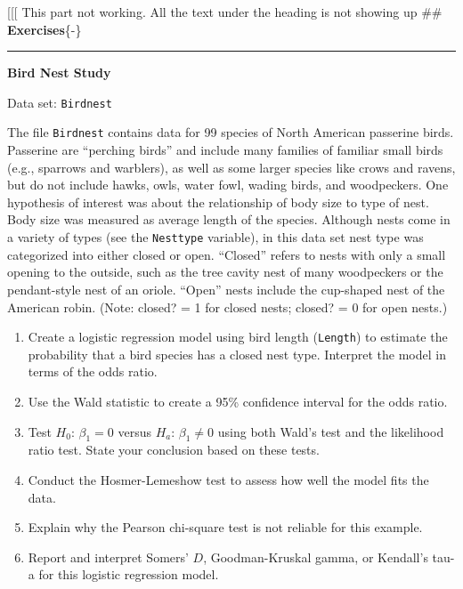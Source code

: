 \documentclass[
]{report}
\begin{document}
{[}{[}{[} This part not working. All the text under the heading is not showing up
\#\# \textbf{Exercises}\{-\}
\vspace{-2em}
\noindent

\rule{\linewidth}{0.4pt}

\renewcommand{\theexcountlr}{E.\arabic{excountlr}}

\begin{list}{E..}{ \setlength{\itemsep}{1.2em}}

  \item \textbf{Bird Nest Study}

Data set: \texttt{Birdnest}

The file \texttt{Birdnest} contains data for 99 species of North American passerine birds. Passerine are “perching birds” and include many families of familiar small birds (e.g., sparrows and warblers), as well as some larger species like crows and ravens, but do not include hawks, owls, water fowl, wading birds, and woodpeckers. One hypothesis of interest was about the relationship of body size to type of nest. Body size was measured as average length of the species. Although nests come in a variety of types (see the \texttt{Nesttype} variable), in this data set nest type was categorized into either closed or open. “Closed” refers to nests with only a small opening to the outside, such as the tree cavity nest of many woodpeckers or the pendant-style nest of an oriole. “Open” nests include the cup-shaped nest of the American robin. (Note: closed? = 1 for closed nests; closed? = 0 for open nests.)

  \begin{enumerate}
    \item Create a logistic regression model using bird length (\texttt{Length}) to estimate the probability that a bird species has a closed nest type. Interpret the model in terms of the odds ratio.
    \item Use the Wald statistic to create a 95\% confidence interval for the odds ratio.
    \item Test $H_0$: $\beta_1 = 0$ versus $H_a$: $\beta_1 \ne 0$ using both Wald’s test and the likelihood ratio test. State your conclusion based on these tests.
    \item Conduct the Hosmer-Lemeshow test to assess how well the model fits the data.
    \item Explain why the Pearson chi-square test is not reliable for this example.
    \item Report and interpret Somers’ $D$, Goodman-Kruskal gamma, or Kendall’s tau-a for this logistic regression model.
  \end{enumerate}


\end{list}
\end{document}
